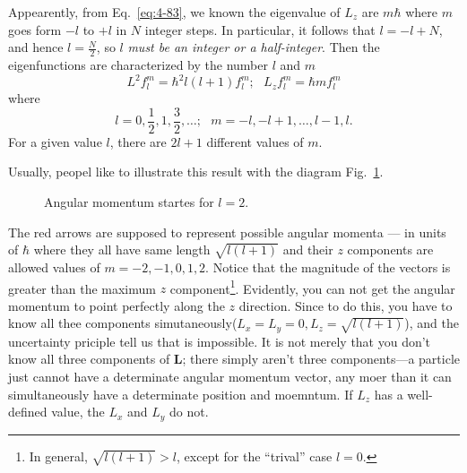 Appearently, from Eq.~\eqref{eq:4-83}, we known the eigenvalue of $L_z$ are $m\hbar$ where $m$ goes form $-l$ to $+l$ in $N$ integer steps.
In particular, it follows that $l=-l +N$, and hence $l= \frac{N}{2}$, so $l$ \textit{must be an integer or a half-integer}.
Then the eigenfunctions are characterized by the number $l$ and $m$
\begin{equation}
  \label{eq:4-84}
  L^2 f_l^m = \hbar^2 l \left( l+1 \right) f_l^m; ~ ~ ~ L_zf_l^m = \hbar m f_l^m
\end{equation}
where
\begin{equation}
  \label{eq:4-85}
  l = 0, \frac{1}{2}, 1, \frac{3}{2}, \ldots ; ~ ~ ~  m = -l, -l+1, \ldots, l-1, l.
\end{equation}
For a given value $l$, there are $2l+1$ different values of $m$.

Usually, peopel like to illustrate this result with the diagram Fig.~\ref{fig:4-3}.
\begin{figure}[h]
  \centering
  \caption{Angular momentum startes for $l=2$.}
  \label{fig:4-3}
\end{figure}
The red arrows are supposed to represent possible angular momenta --- in units of $\hbar$ where they all have same length $\sqrt{l \left( l+1 \right)}$ and their $z$ components are allowed values of $m=-2,-1,0,1,2$.
Notice that the magnitude of the vectors is greater than the maximum $z$ component\footnote{In general, $\sqrt{l \left( l+1 \right)} > l$, except for the ``trival'' case $l=0$.}.
Evidently, you can not get the angular momentum to point perfectly along the $z$ direction.
Since to do this, you have to know all thee components simutaneously($L_x=L_y=0, L_z = \sqrt{l \left( l+1 \right)}$), and the uncertainty priciple tell us that is impossible.
It is not merely that you don't know all three components of $\mathbf{L}$; there simply aren't three components---a particle just cannot have a determinate angular momentum vector, any moer than it can simultaneously have a determinate position and moemntum.
If $L_z$ has a well-defined value, the $L_x$ and $L_y$ do not.

